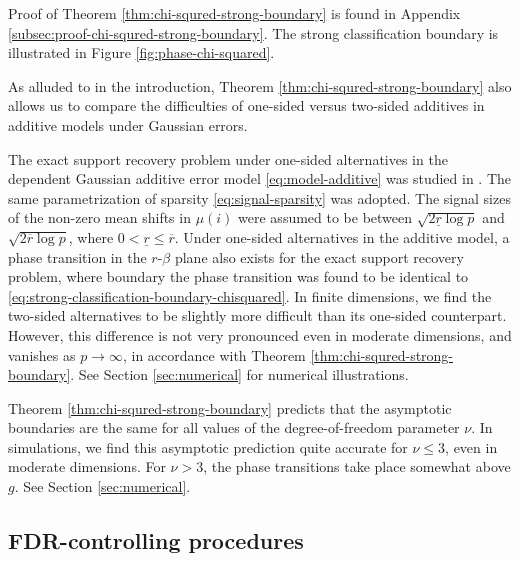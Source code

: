 Proof of Theorem \ref{thm:chi-squred-strong-boundary} is found in Appendix \ref{subsec:proof-chi-squred-strong-boundary}. 
The strong classification boundary is illustrated in Figure \ref{fig:phase-chi-squared}.

As alluded to in the introduction, Theorem \ref{thm:chi-squred-strong-boundary} also allows us to compare the difficulties of one-sided versus two-sided additives in additive models under Gaussian errors.

\begin{remark} \label{rmk:strong-classification-boundary-1}
The exact support recovery problem under one-sided alternatives in the dependent Gaussian additive error model \eqref{eq:model-additive} was studied in \cite{gao2018fundamental}.
The same parametrization of sparsity \eqref{eq:signal-sparsity} was adopted.
The signal sizes of the non-zero mean shifts in $\mu(i)$ were assumed to be between $\sqrt{2\underline{r}\log{p}}$ and $\sqrt{2\overline{r}\log{p}}$, where $0<\underline{r}\le\overline{r}$.
Under one-sided alternatives in the additive model, a phase transition in the $r$-$\beta$ plane also exists for the exact support recovery problem,
where boundary the phase transition was found to be identical to \eqref{eq:strong-classification-boundary-chisquared}.
In finite dimensions, we find the two-sided alternatives to be slightly more difficult than its one-sided counterpart. 
However, this difference is not very pronounced even in moderate dimensions, and vanishes as $p\to\infty$, in accordance with Theorem \ref{thm:chi-squred-strong-boundary}. 
See Section \ref{sec:numerical} for numerical illustrations.
\end{remark}

\begin{remark} \label{rmk:strong-classification-boundary-2}
Theorem \ref{thm:chi-squred-strong-boundary} predicts that the asymptotic boundaries are the same for all values of the degree-of-freedom parameter $\nu$.
In simulations, we find this asymptotic prediction quite accurate for $\nu\le3$, even in moderate dimensions. 
For $\nu>3$, the phase transitions take place somewhat above ${g}$.
See Section \ref{sec:numerical}.
\end{remark}

\subsection{FDR-controlling procedures}
\label{subsec:FDR-controlling-procedures}

